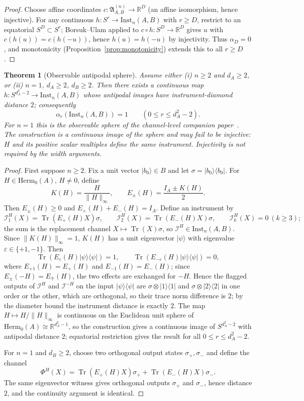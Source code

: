 \documentclass[11pt,a4paper]{article}
\newtheorem{theorem}{Theorem}[section]
\newcommand{\Herm}{\mathrm{Herm}}
\newcommand{\Inst}{\mathrm{Inst}}
\newcommand{\Tr}{\operatorname{Tr}}
\begin{document}
\begin{proof}
Choose affine coordinates $c:\mathfrak A_{A,B}^{(n)}\to\mathbb R^{D}$ (an affine isomorphism, hence injective). For any continuous $h:S^r\to\Inst_n(A,B)$ with $r\ge D$, restrict to an equatorial $S^D\subset S^r$; Borsuk--Ulam applied to $c\circ h:S^D\to\mathbb R^D$ gives $u$ with $c(h(u))=c(h(-u))$, hence $h(u)=h(-u)$ by injectivity. Thus $\alpha_D=0$, and monotonicity (Proposition~\ref{prop:monotonicity}) extends this to all $r\ge D$.
\end{proof}

\begin{theorem}[Observable antipodal sphere]
\label{thm:observable}
Assume either (i) $n\ge2$ and $d_A\ge2$, or (ii) $n=1$, $d_A\ge2$, $d_B\ge2$. Then there exists a continuous map $h:S^{d_A^2-2}\to\Inst_n(A,B)$ whose antipodal images have instrument-diamond distance $2$; consequently
\[
\alpha_r(\Inst_n(A,B))=1\qquad(0\le r\le d_A^2-2).
\]
For $n=1$ this is the observable sphere of the channel-level companion paper~\cite{CompanionChannels}. The construction is a continuous image of the sphere and may fail to be injective: $H$ and its positive scalar multiples define the same instrument. Injectivity is not required by the width arguments.
\end{theorem}

\begin{proof}
First suppose $n\ge2$. Fix a unit vector $|b_0\rangle\in B$ and let $\sigma=|b_0\rangle\langle b_0|$. For $H\in\Herm_0(A)$, $H\neq0$, define
\[
K(H)=\frac{H}{\|H\|_\infty},\qquad E_\pm(H)=\frac{I_A\pm K(H)}2.
\]
Then $E_\pm(H)\ge0$ and $E_+(H)+E_-(H)=I_A$. Define an instrument by
\[
\mathcal I^H_1(X)=\Tr(E_+(H)X)\sigma,\qquad
\mathcal I^H_2(X)=\Tr(E_-(H)X)\sigma,\qquad
\mathcal I^H_k(X)=0\ (k\ge3);
\]
the sum is the replacement channel $X\mapsto\Tr(X)\sigma$, so $\mathcal I^H\in\Inst_n(A,B)$. Since $\|K(H)\|_\infty=1$, $K(H)$ has a unit eigenvector $|\psi\rangle$ with eigenvalue $\varepsilon\in\{+1,-1\}$. Then
\[
\Tr(E_{\varepsilon}(H)|\psi\rangle\langle\psi|)=1,\qquad
\Tr(E_{-\varepsilon}(H)|\psi\rangle\langle\psi|)=0,
\]
where $E_{+1}(H)=E_+(H)$ and $E_{-1}(H)=E_-(H)$; since $E_\pm(-H)=E_\mp(H)$, the two effects are exchanged for $-H$. Hence the flagged outputs of $\mathcal I^H$ and $\mathcal I^{-H}$ on the input $|\psi\rangle\langle\psi|$ are $\sigma\otimes|1\rangle\langle1|$ and $\sigma\otimes|2\rangle\langle2|$ in one order or the other, which are orthogonal, so their trace norm difference is $2$; by the diameter bound the instrument distance is exactly $2$. The map $H\mapsto H/\|H\|_\infty$ is continuous on the Euclidean unit sphere of $\Herm_0(A)\cong\mathbb R^{d_A^2-1}$, so the construction gives a continuous image of $S^{d_A^2-2}$ with antipodal distance $2$; equatorial restriction gives the result for all $0\le r\le d_A^2-2$.

For $n=1$ and $d_B\ge2$, choose two orthogonal output states $\sigma_+,\sigma_-$ and define the channel
\[
\Phi^H(X)=\Tr(E_+(H)X)\sigma_++\Tr(E_-(H)X)\sigma_-.
\]
The same eigenvector witness gives orthogonal outputs $\sigma_+$ and $\sigma_-$, hence distance $2$, and the continuity argument is identical.
\end{proof}
\end{document}
